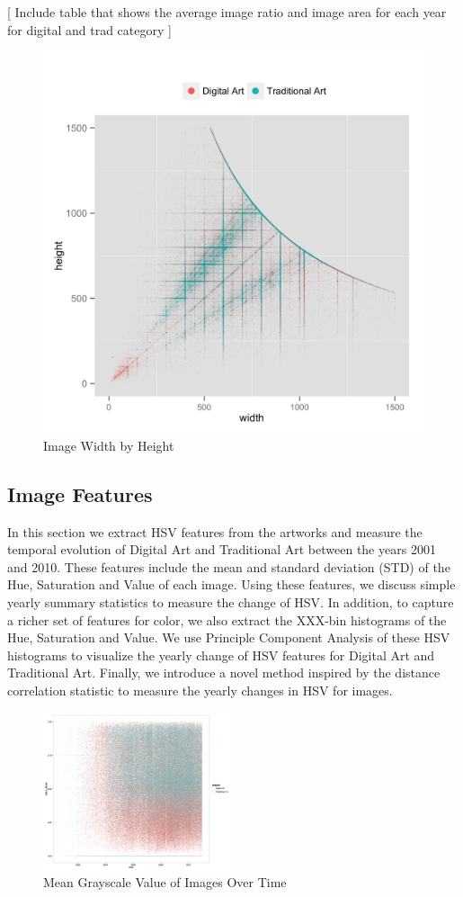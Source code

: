 \documentclass[letterpaper]{article}
\begin{document}
[ Include table that shows the average image ratio and image area for each year for digital and trad category ]

\begin{figure}
    \includegraphics[width = .5\textwidth]{width_height}
  \caption{Image Width by Height}
\end{figure}


\subsection{Image Features} In this section we extract HSV features from the artworks and measure the temporal evolution of Digital Art and Traditional Art between the years 2001 and 2010. These features include the mean and standard deviation (STD) of the Hue, Saturation and Value of each image. Using these features, we discuss simple yearly summary statistics to measure the change of HSV. In addition, to capture a richer set of features for color, we also extract the XXX-bin histograms of the Hue, Saturation and Value. We use Principle Component Analysis of these HSV histograms to visualize the yearly change of HSV features for Digital Art and Traditional Art. Finally, we introduce a novel method inspired by the distance correlation statistic to measure the yearly changes in HSV for images. 

\begin{figure}
    \includegraphics[width=0.5\textwidth]{value_mean_per_image_over_dates_PNG}
    \caption{Mean Grayscale Value of Images Over Time}
    \label{fig:MeanGrayScale}
\end{figure}
\end{document}
